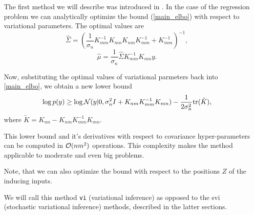 The first method we will describe was introduced in \cite{Titsias}. In the case of the regression problem we can analytically optimize the bound (\ref{main_elbo}) with respect to variational parameters. The optimal values are
$$\hat \Sigma = (\frac 1 {\sigma_n} K_{mm}^{-1} K_{mn} K_{nm} K_{mm}^{-1} + K_{mm}^{-1})^{-1},$$
$$\hat \mu = \frac 1 {\sigma_n} \hat \Sigma K_{mm}^{-1} K_{mn} y.$$

Now, substituting the optimal values of variational parmeters back into \ref{main_elbo}, we obtain a new lower bound
\begin{equation}\label{titsias_elbo}
	\log p(y) \ge \log \mathcal{N}(y|0, \sigma_n^2 I + K_{nm} K_{mm}^{-1} K_{mn}) - \frac 1 {2\sigma_n^2} \mbox{tr}(\tilde K),
\end{equation}
where $\tilde K = K_{nn} - K_{nm} K_{mm}^{-1} K_{mn}$.

This lower bound and it's derivatives with respect to covariance hyper-parameters can be computed in $\mathcal{O}(nm^2)$ operations. This complexity makes the method applicable to moderate and even big problems.

Note, that we can also optimize the bound with respect to the positions $Z$ of the inducing inputs.

We will call this method \lstinline{vi} (variational inference) as opposed to the svi (stochastic variational inference) methods, described in the latter sections.